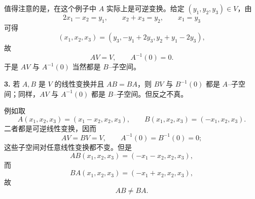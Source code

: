 值得注意的是，在这个例子中 $A$ 实际上是可逆变换。给定 $(y_1,y_2,y_3)\in V$，由
\[
2x_1-x_2=y_1,
\qquad
x_2+x_3=y_2,
\qquad
x_1=y_3
\]
可得
\[
(x_1,x_2,x_3)=(y_3,-y_1+2y_3,y_2+y_1-2y_3),
\]
故
\[
AV=V,
\qquad
A^{-1}(0)=0.
\]
于是 $AV$ 与 $A^{-1}(0)$ 当然都是 $B$--子空间。

\textbf{3.} 若 $A,B$ 是 $V$ 的线性变换并且 $AB=BA$，则 $BV$ 与 $B^{-1}(0)$ 都是 $A$--子空间；同样，$AV$ 与 $A^{-1}(0)$ 都是 $B$--子空间。但反之不真。

例如取
\[
A(x_1,x_2,x_3)=(x_1-x_2,x_2,x_3),
\qquad
B(x_1,x_2,x_3)=(-x_1,x_2,x_3).
\]
二者都是可逆线性变换，因而
\[
AV=BV=V,
\qquad
A^{-1}(0)=B^{-1}(0)=0;
\]
这些子空间对任意线性变换都不变。但是
\[
AB(x_1,x_2,x_3)=(-x_1-x_2,x_2,x_3),
\]
而
\[
BA(x_1,x_2,x_3)=(-x_1+x_2,x_2,x_3),
\]
故
\[
AB\ne BA.
\]
